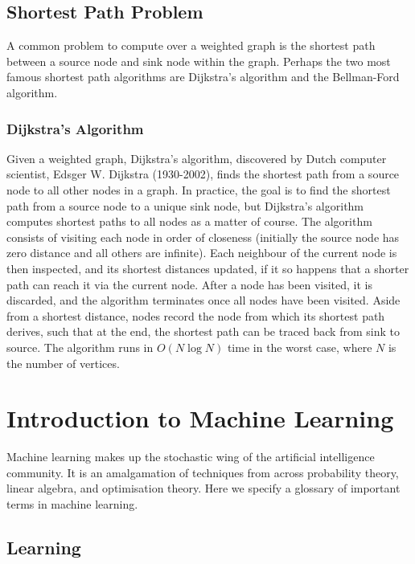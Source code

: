 \documentclass[11pt]{amsart}
\begin{document}
\subsection{Shortest Path Problem}

A common problem to compute over a weighted graph is the shortest path between a source node and sink node within the graph. Perhaps the two most famous shortest path algorithms are Dijkstra's algorithm and the Bellman-Ford algorithm.

\subsubsection{Dijkstra's Algorithm}

Given a weighted graph, Dijkstra's algorithm, discovered by Dutch computer scientist,  Edsger W. Dijkstra (1930-2002), finds the shortest path from a source node to all other nodes in a graph. In practice, the goal is to find the shortest path from a source node to a unique sink node, but Dijkstra's algorithm computes shortest paths to all nodes as a matter of course. The algorithm consists of visiting each node in order of closeness (initially the source node has zero distance and all others are infinite). Each neighbour of the current node is then inspected, and its shortest distances updated, if it so happens that a shorter path can reach it via the current node. After a node has been visited, it is discarded, and the algorithm terminates once all nodes have been visited. Aside from a shortest distance, nodes record the node from which its shortest path derives, such that at the end, the shortest path can be traced back from sink to source. The algorithm runs in $O(N\log N)$ time in the worst case, where $N$ is the number of vertices.

\section{Introduction to Machine Learning}

Machine learning makes up the stochastic wing of the artificial intelligence community. It is an amalgamation of techniques from across probability theory, linear algebra, and optimisation theory. Here we specify a glossary of important terms in machine learning.

\subsection{Learning}
\end{document}
